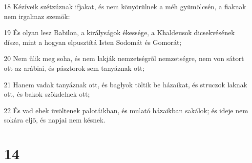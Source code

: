 \par 18 Kézíveik szétzúznak ifjakat, és nem könyörülnek a méh gyümölcsén, a fiaknak nem irgalmaz szemök:
\par 19 És olyan lesz Babilon, a királyságok ékessége, a Khaldeusok dicsekvésének dísze, mint a hogyan elpusztítá Isten Sodomát és Gomorát;
\par 20 Nem ülik meg soha, és nem lakják nemzetségrõl nemzetségre, nem von sátort ott az arábiai, és pásztorok sem tanyáznak ott;
\par 21 Hanem vadak tanyáznak ott, és baglyok töltik be házaikat, és struczok laknak ott, és bakok szökdelnek ott;
\par 22 És vad ebek üvöltenek palotáikban, és mulató házaikban sakálok; és ideje nem sokára eljõ, és napjai nem késnek.

\chapter{14}

